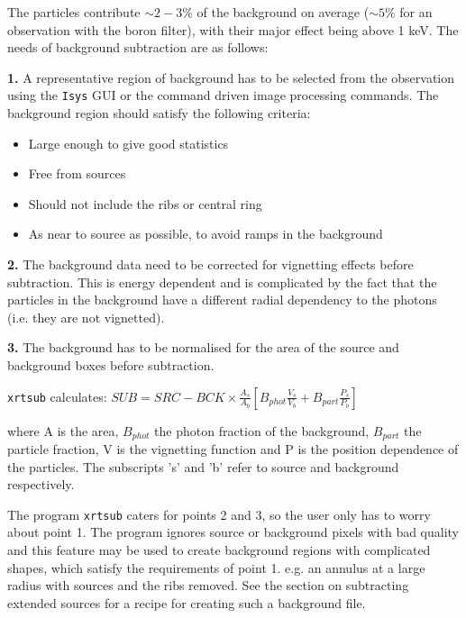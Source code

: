\documentclass[11pt,fleqn]{article}    %
\begin{document}
The particles contribute $\sim2-3\%$ of the background on average 
($\sim 5\%$ for an observation with the boron filter), with their major
effect being above 1 keV. The needs of background subtraction are as
follows:

{\bf 1.} A representative region of background has to be selected 
from the observation using the {\tt Isys} GUI or the command driven image
processing commands.
The background region should satisfy the following criteria:

\begin{itemize}
       \item{Large enough to give good statistics}
       \item{Free from sources}
       \item{Should not include the ribs or central ring}
       \item{As near to source as possible, to avoid ramps in the background}
\end{itemize}

{\bf 2.} The background data need to be corrected for vignetting effects
before subtraction. This is energy dependent and is complicated by the fact
that the particles in the background have a different radial dependency 
to the photons (i.e. they are not vignetted).

{\bf 3.} The background has to be normalised for the area of the source
and background boxes before subtraction.

{\tt xrtsub} calculates: 
\begin{math}
SUB = SRC - BCK \times \frac {A_{s}} {A_{b}} \left[
B_{phot} \frac {V_{s}} {V_{b}} + B_{part} \frac {P_{s}} {P_{b}} \right]
\end{math}

where A is the area, $B_{phot}$ the photon fraction of the background, 
$B_{part}$ the particle fraction, V is the vignetting function and P is the
position dependence of the particles. The subscripts 's' and 'b' refer to
source and background respectively.


The program {\tt xrtsub} caters for points 2 and 3, so the user only has to
worry about point 1. The program ignores source or background pixels with
bad quality and this feature may be used to create background regions with
complicated shapes, which satisfy the requirements of point 1. e.g. an
annulus at a large radius with sources and the ribs removed. See the 
section on subtracting extended sources for a recipe for creating such a
background file.
\end{document}
